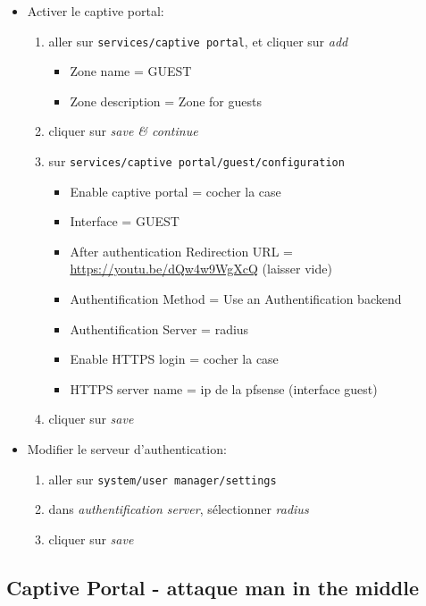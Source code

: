 \documentclass[a4paper]{article}
\begin{document}
\begin{itemize}
\item Activer le captive portal:
\begin{enumerate}
    \item aller sur \texttt{services/captive portal}, et cliquer sur \textit{add}
    \begin{itemize}
        \item Zone name = GUEST
        \item Zone description = Zone for guests
    \end{itemize}
    \item cliquer sur \textit{save \& continue}
    \item sur \texttt{services/captive portal/guest/configuration}
    \begin{itemize}
        \item Enable captive portal = cocher la case
        \item Interface = GUEST
        \item After authentication Redirection URL = \url{https://youtu.be/dQw4w9WgXcQ} (laisser vide)
        \item Authentification Method = Use an Authentification backend
        \item Authentification Server = radius
        \item Enable HTTPS login = cocher la case
        \item HTTPS server name = ip de la pfsense (interface guest)
    \end{itemize}
    \item cliquer sur \textit{save}
\end{enumerate}

\item Modifier le serveur d'authentication:
\begin{enumerate}
    \item aller sur \texttt{system/user manager/settings}
    \item dans \textit{authentification server}, sélectionner \textit{radius}
    \item cliquer sur \textit{save}
\end{enumerate}

\end{itemize}










\subsection{Captive Portal - attaque man in the middle}
\end{document}
